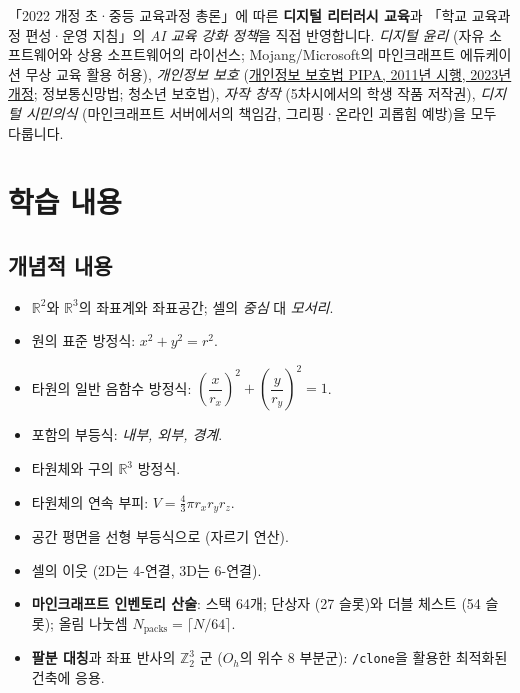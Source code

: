 \documentclass[12pt,a4paper]{scrartcl}
\newcommand{\acc}[1]{\textcolor{accent}{\textbf{#1}}}
\newcommand{\cmd}[1]{\textcolor{earth}{\texttt{\small #1}}}
\begin{document}
「2022 개정 초·중등 교육과정 총론」에 따른 \acc{디지털 리터러시 교육}과 「학교 교육과정 편성·운영 지침」의 \emph{AI 교육 강화 정책}을 직접 반영합니다. \emph{디지털 윤리} (자유 소프트웨어와 상용 소프트웨어의 라이선스; Mojang/Microsoft의 마인크래프트 에듀케이션 무상 교육 활용 허용), \emph{개인정보 보호} (\href{https://www.law.go.kr/}{개인정보 보호법 PIPA, 2011년 시행, 2023년 개정}; 정보통신망법; 청소년 보호법), \emph{자작 창작} (5차시에서의 학생 작품 저작권), \emph{디지털 시민의식} (마인크래프트 서버에서의 책임감, 그리핑·온라인 괴롭힘 예방)을 모두 다룹니다.

\section{학습 내용}\label{sec:conteudos}

\subsection{개념적 내용}
\begin{itemize}[leftmargin=1.3em,itemsep=0.15em,topsep=0.3em]
  \item $\mathbb{R}^2$와 $\mathbb{R}^3$의 좌표계와 좌표공간; 셀의 \emph{중심} 대 \emph{모서리}.
  \item 원의 표준 방정식: $x^2 + y^2 = r^2$.
  \item 타원의 일반 음함수 방정식: $\left(\dfrac{x}{r_x}\right)^{\!2} + \left(\dfrac{y}{r_y}\right)^{\!2} = 1$.
  \item 포함의 부등식: \emph{내부, 외부, 경계}.
  \item 타원체와 구의 $\mathbb{R}^3$ 방정식.
  \item 타원체의 연속 부피: $V = \tfrac{4}{3}\pi r_x r_y r_z$.
  \item 공간 평면을 선형 부등식으로 (자르기 연산).
  \item 셀의 이웃 (2D는 4-연결, 3D는 6-연결).
  \item \acc{마인크래프트 인벤토리 산술}: 스택 64개; 단상자 (27 슬롯)와 더블 체스트 (54 슬롯); 올림 나눗셈 $N_{\mathrm{packs}} = \lceil N/64 \rceil$.
  \item \acc{팔분 대칭}과 좌표 반사의 $\mathbb{Z}_2^3$ 군 ($O_h$의 위수 8 부분군): \cmd{/clone}을 활용한 최적화된 건축에 응용.
\end{itemize}
\end{document}
